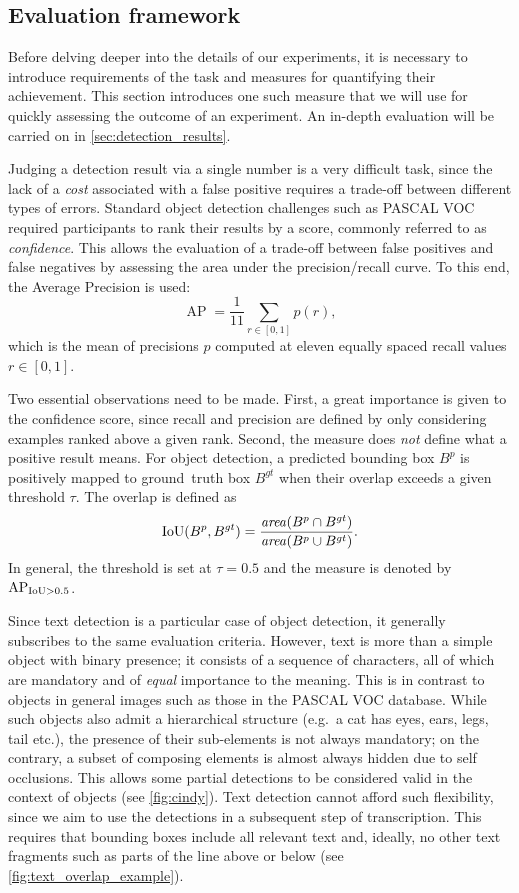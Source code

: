 
	\subsection{Evaluation framework}\label{sec:detection_eval}
		Before delving deeper into the details of our experiments, it is necessary to introduce requirements of the task and measures for quantifying their achievement. This section introduces one such measure that we will use for quickly assessing the outcome of an experiment. An in-depth evaluation will be carried on in \autoref{sec:detection_results}.

		Judging a detection result via a single number is a very difficult task, since the lack of a \emph{cost} associated with a false positive requires a trade-off between different types of errors. Standard object detection challenges such as PASCAL VOC \citep{pascal_voc} required participants to rank their results by a score, commonly referred to as \emph{confidence}. This allows the evaluation of a trade-off between false positives and false negatives by assessing the area under the precision/recall curve. To this end, the Average Precision is used:\[
			\operatorname{AP} = \frac{1}{11} \sum_{r \in [0,1]} p(r),
		\] which is the mean of precisions \(p\) computed at eleven equally spaced recall values \(r \in [0,1]\).

		Two essential observations need to be made. First, a great importance is given to the confidence score, since recall and precision are defined by only considering examples ranked above a given rank. Second, the measure does \emph{not} define what a positive result means. For object detection, a predicted bounding box \(B^p\) is positively mapped to \mbox{ground truth} box \(B^{gt}\) when their overlap exceeds a given threshold \(\tau\). The overlap is defined as \[
			\operatorname{IoU}(B^p, B^{gt}) = \frac{\mathit{area}(B^p \cap B^{gt})}{\mathit{area}(B^p \cup B^{gt})}.
		\] In general, the threshold is set at \(\tau = 0.5\) and the measure is denoted by \(\operatorname{\operatorname{AP}_{\operatorname{IoU} > 0.5}}\).

		Since text detection is a particular case of object detection, it generally subscribes to the same evaluation criteria. However, text is more than a simple object with binary presence; it consists of a sequence of characters, all of which are mandatory and of \emph{equal} importance to the meaning. This is in contrast to objects in general images such as those in the PASCAL VOC database. While such objects also admit a hierarchical structure (e.g.\ a cat has eyes, ears, legs, tail etc.), the presence of their sub-elements is not always mandatory; on the contrary, a subset of composing elements is almost always hidden due to self occlusions. This allows some partial detections to be considered valid in the context of objects (see \autoref{fig:cindy}). Text detection cannot afford such flexibility, since we aim to use the detections in a subsequent step of transcription. This requires that bounding boxes include all relevant text and, ideally, no other text fragments such as parts of the line above or below (see \autoref{fig:text_overlap_example}).


